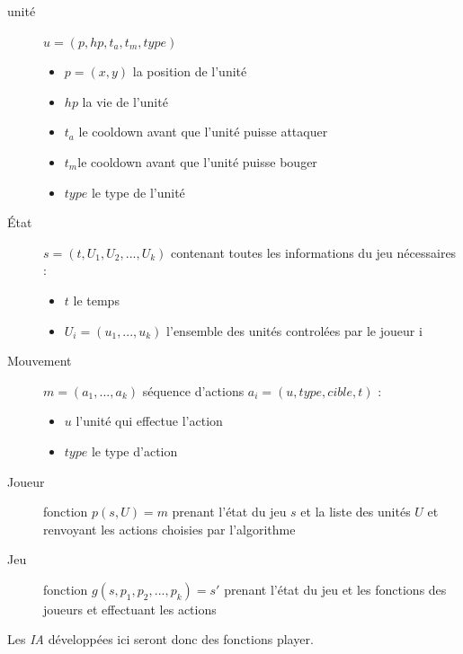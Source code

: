 \documentclass[a4paper, 11pt]{article}
\theoremstyle{definition}
\begin{document}
\begin{description}
    \item[unité] $u = (p, hp, t_a, t_m, type)$
    \begin{itemize}
        \item $p = (x,y)$ la position de l'unité
        \item $hp$ la vie de l'unité
        \item $t_a$ le cooldown avant que l'unité puisse attaquer
        \item $t_m$le cooldown avant que l'unité puisse bouger
        \item $type$ le type de l'unité
    \end{itemize} 
    \item[État] $s = (t, U_1, U_2, ..., U_k)$ contenant toutes les informations du jeu nécessaires :
    \begin{itemize}
        \item $t$ le temps
        \item $U_i = (u_1,...,u_k)$ l'ensemble des unités controlées par le joueur i
    \end{itemize} 
    \item[Mouvement] $m= ( a_1,..., a_k )$ séquence d'actions $a_i = (u, type, cible, t)$ :
    \begin{itemize}
        \item $u$ l'unité qui effectue l'action
        \item $type$ le type d'action
    \end{itemize}
    \item[Joueur] fonction $p(s,U) = m$ prenant l'état du jeu $s$ et la liste des unités $U$
    et renvoyant les actions choisies par l'algorithme
    \item[Jeu] fonction $g(s, p_1, p_2, ..., p_k) = s'$ prenant l'état du jeu et
    les fonctions des joueurs et effectuant les actions
\end{description}

Les \emph{IA} développées ici seront donc des fonctions player.
\end{document}
